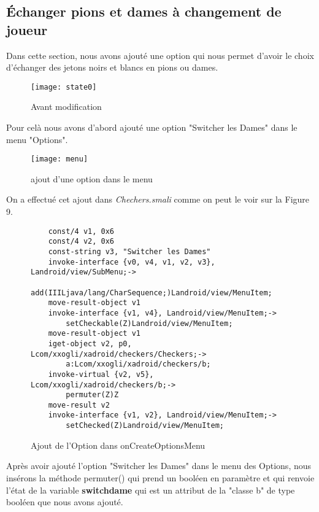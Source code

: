 
\subsection{Échanger pions et dames à changement de joueur}

Dans cette section, nous avons ajouté une option qui nous permet d'avoir le choix d'échanger 
des jetons noirs et blancs en pions ou dames.


\begin{figure}[hp]
	      \begin{center}
			\texttt{[image: state0]}
	      \end{center}
	\caption{Avant modification}
\end{figure}
Pour celà nous avons d'abord ajouté une option "Switcher les Dames" dans le menu "Options". 
\begin{figure}[h!]
	      \begin{center}
			\texttt{[image: menu]}
		  \end{center}
	\caption{ajout d'une option dans le menu}
\end{figure}
On a effectué cet ajout dans \textit{Chechers.smali} comme on peut le voir sur la Figure 9.\newpage

\begin{figure}[h!]
\begin{verbatim}
    const/4 v1, 0x6
    const/4 v2, 0x6
    const-string v3, "Switcher les Dames"
    invoke-interface {v0, v4, v1, v2, v3}, Landroid/view/SubMenu;->
        add(IIILjava/lang/CharSequence;)Landroid/view/MenuItem;
    move-result-object v1
    invoke-interface {v1, v4}, Landroid/view/MenuItem;->
        setCheckable(Z)Landroid/view/MenuItem;
    move-result-object v1
    iget-object v2, p0, Lcom/xxogli/xadroid/checkers/Checkers;->
        a:Lcom/xxogli/xadroid/checkers/b;
    invoke-virtual {v2, v5}, Lcom/xxogli/xadroid/checkers/b;->
        permuter(Z)Z
    move-result v2
    invoke-interface {v1, v2}, Landroid/view/MenuItem;->
        setChecked(Z)Landroid/view/MenuItem;
    \end{verbatim}
    \caption{Ajout de l'Option dans onCreateOptionsMenu}
\end{figure}


Après avoir ajouté l'option "Switcher les Dames" dans le menu des Options, nous insérons la méthode permuter() qui prend 
un booléen en paramètre et qui renvoie l'état de la variable \textbf{switchdame} qui est un attribut de la "classe b" de type booléen que nous avons ajouté.


